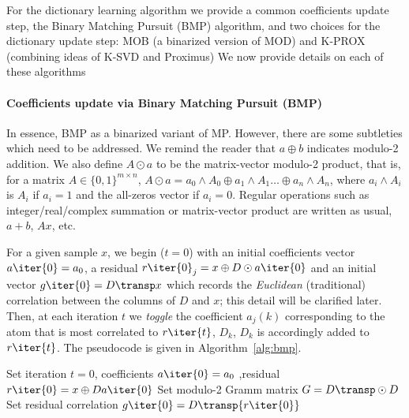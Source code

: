 \documentclass[twocolumn]{IEEEtran}
\begin{document}
For the dictionary learning algorithm we provide a common coefficients update step, the Binary Matching Pursuit (BMP) algorithm, and  two choices for the dictionary update step: MOB (a binarized version of MOD) and K-PROX (combining ideas of K-SVD and Proximus)  We now provide details on each of these algorithms

\paragraph{Coefficients update via Binary Matching Pursuit (BMP)}

In essence,  BMP as a binarized variant of MP. However, there are some subtleties which need to be addressed. We remind the reader that $a \oplus b$ indicates modulo-2 addition. We also define $A \odot a$ to be the matrix-vector modulo-2 product, that is, for a matrix $A \in \{0,1\}^{m{\times}n}$, $A \odot a = a_0 \land A_0 \oplus a_1 \land A_1 \ldots \oplus a_n \land A_n$, where $a_i \land A_i$ is $A_i$ if $a_i = 1$ and the all-zeros vector if $a_i = 0$.  Regular operations such as integer/real/complex summation or matrix-vector product are written as usual, $a+b$, $Ax$, etc.

For a given sample $x$, we begin ($t=0$) with an initial coefficients vector $a\iter{0}=a_0$, a residual $r\iter{0}_j=x \oplus D \odot a\iter{0}$ and an initial vector $g\iter{0}=D\transp x$ which records the \emph{Euclidean} (traditional)  correlation between the columns of $D$ and $x$; this detail will be clarified later. Then, at each iteration $t$ we \emph{toggle} the coefficient $a_j(k)$ corresponding to the atom that is most correlated to $r\iter{t}$, $D_{k}$, $D_k$ is accordingly added to $r\iter{t}$. The pseudocode is given in Algorithm~\ref{alg:bmp}. 
%
\begin{algorithm}[ht]
Set iteration $t=0$, coefficients $a\iter{0}=a_0$ ,residual $r\iter{0}=x \oplus Da\iter{0}$\;
Set modulo-2 Gramm matrix $G = D\transp \odot D$
Set residual correlation $g\iter{0}=D\transp{r\iter{0}}$
\label{alg:bmp}
\end{algorithm}
\end{document}
